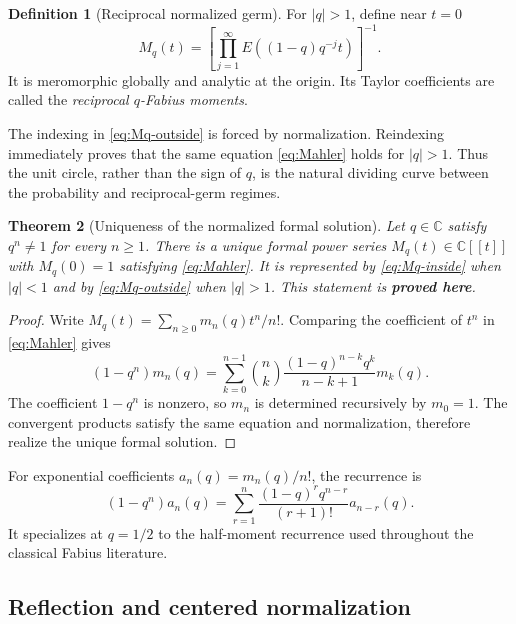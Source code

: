 \documentclass[11pt,oneside]{article}
\numberwithin{equation}{section}
\newtheorem{theorem}{Theorem}[section]
\theoremstyle{definition}
\newtheorem{definition}[theorem]{Definition}
\theoremstyle{remark}
\newcommand{\C}{\mathbb C}
\newcommand{\proved}{\textcolor{deepgreen}{\textbf{proved here}}}
\begin{document}
\begin{definition}[Reciprocal normalized germ]
For $|q|>1$, define near $t=0$
\begin{equation}
 M_q(t)=
 \left[
  \prod_{j=1}^{\infty}E\!\left((1-q)q^{-j}t\right)
 \right]^{-1}.
 \label{eq:Mq-outside}
\end{equation}
It is meromorphic globally and analytic at the origin.  Its Taylor
coefficients are called the \emph{reciprocal $q$-Fabius moments}.
\end{definition}

The indexing in \eqref{eq:Mq-outside} is forced by normalization.  Reindexing
immediately proves that the same equation \eqref{eq:Mahler} holds for
$|q|>1$.  Thus the unit circle, rather than the sign of $q$, is the natural
dividing curve between the probability and reciprocal-germ regimes.

\begin{theorem}[Uniqueness of the normalized formal solution]
\label{thm:formal-unique}
Let $q\in\C$ satisfy $q^n\ne1$ for every $n\ge1$.  There is a unique formal
power series $M_q(t)\in\C[[t]]$ with $M_q(0)=1$ satisfying
\eqref{eq:Mahler}.  It is represented by \eqref{eq:Mq-inside} when $|q|<1$
and by \eqref{eq:Mq-outside} when $|q|>1$.  This statement is \proved.
\end{theorem}

\begin{proof}
Write $M_q(t)=\sum_{n\ge0}m_n(q)t^n/n!$.  Comparing the coefficient of $t^n$
in \eqref{eq:Mahler} gives
\begin{equation}
 (1-q^n)m_n(q)
 =\sum_{k=0}^{n-1}\binom nk
   \frac{(1-q)^{n-k}q^k}{n-k+1}m_k(q).
 \label{eq:moment-recurrence}
\end{equation}
The coefficient $1-q^n$ is nonzero, so $m_n$ is determined recursively by
$m_0=1$.  The convergent products satisfy the same equation and normalization,
therefore realize the unique formal solution.
\end{proof}

For exponential coefficients $a_n(q)=m_n(q)/n!$, the recurrence is
\begin{equation}
 (1-q^n)a_n(q)=
 \sum_{r=1}^{n}
 \frac{(1-q)^rq^{n-r}}{(r+1)!}a_{n-r}(q).
 \label{eq:an-recurrence}
\end{equation}
It specializes at $q=1/2$ to the half-moment recurrence used throughout the
classical Fabius literature.

\subsection{Reflection and centered normalization}
\end{document}
